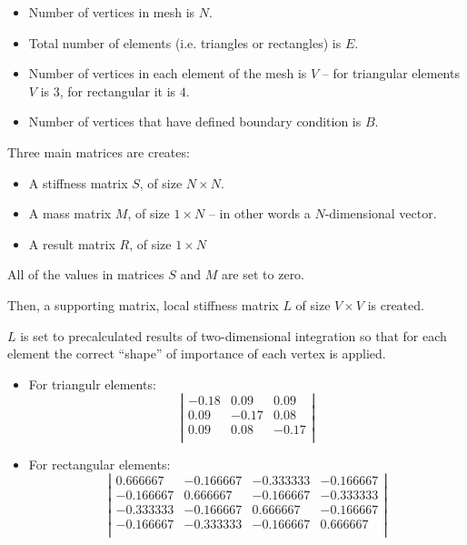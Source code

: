 \documentclass[a4paper,12pt]{article}
\begin{document}
\begin{itemize}

  \item Number of vertices in mesh is $N$.

  \item Total number of elements (i.e. triangles or rectangles) is $E$.

  \item Number of vertices in each element of the mesh is $V$ -- for triangular elements $V$ is $3$, for rectangular it
  is $4$.

  \item Number of vertices that have defined boundary condition is $B$.

\end{itemize}

Three main matrices are creates:

\begin{itemize}

  \item A stiffness matrix $S$, of size $N \times N$.

  \item A mass matrix $M$, of size $1 \times N$ -- in other words a $N$-dimensional vector.

  \item A result matrix $R$, of size $1 \times N$

\end{itemize}

All of the values in matrices $S$ and $M$ are set to zero.

Then, a supporting matrix, local stiffness matrix $L$ of size $V \times V$ is created.

$L$ is set to precalculated results of two-dimensional integration so that for each element the correct ``shape'' of
importance of each vertex is applied.

\begin{itemize}

  \item For triangulr elements:
  \[
  \left| \begin{array}{rrr}
  -0.18 &  0.09 &  0.09 \\
   0.09 & -0.17 &  0.08 \\
   0.09 &  0.08 & -0.17 \\
  \end{array} \right|
  \]

  \item For rectangular elements:
  \[
  \left| \begin{array}{rrrr}
   0.666667 & -0.166667 & -0.333333 & -0.166667 \\
  -0.166667 &  0.666667 & -0.166667 & -0.333333 \\
  -0.333333 & -0.166667 &  0.666667 & -0.166667 \\
  -0.166667 & -0.333333 & -0.166667 &  0.666667 \\
  \end{array} \right|
  \]

\end{itemize}
\end{document}

